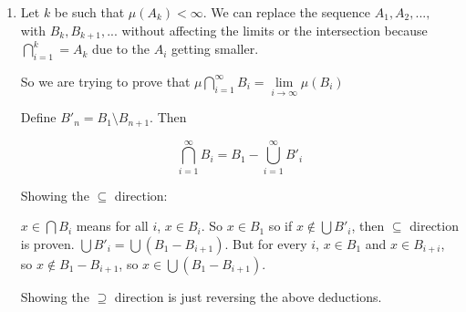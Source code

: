 \documentclass[11pt,oneside]{article}
\numberwithin{equation}{section}
\theoremstyle{definition}
\begin{document}
\begin{solution}
\begin{enumerate}
    Unlike the $A_i$, the $B_i$ are non-overlapping.
    
    Let $x \in B_n$ for some (first) $n$.  Then $x \in A_n$. Then for
    all $m > n$, $x \notin B_m$, as $B_{m} = A_{m} \setminus A_{m-1}$, and
    $x \in A_{m-1}$, when $m > n$. 

    So, by (ii) of the definition of a measure space,
    $$
    \mu ( \bigcup \limits _ {i=1} ^ \infty B_i ) = \sum \limits _ {i=1} ^ \infty \mu (B_i)
    $$
    Since the union of the $A_i$ and the $B_i$ are equal, 
    $$
    \mu ( \bigcup \limits _ {i=1} ^ \infty B_i ) =    \mu ( \bigcup \limits _ {i=1} ^ \infty A_i)
    $$
    Now we have to show that
    $$
    \lim _ {n \to \infty} \mu ( A_n ) = \sum \limits _ {i=1} ^ \infty \mu (B_i)
    $$
    However,
    $$
    \mu (A_n) =  \mu \bigcup \limits _ {i=1} ^ n (B_i)
    $$
    So, 
    $$
    \mu(A_n) = \sum \limits _ {i=i} ^ n \mu (B_i).
    $$
    Taking limits (the sequences are identical at every term and we are in the extended reals so convergance is not an issue):

    $$
    \lim _ {n \to \infty} \mu ( A_n ) = \sum \limits _ {i=1} ^ \infty \mu (B_i)
    $$
    As needed to prove the result \qed
  \item
    Let $k$ be such that $\mu (A_k) < \infty$.  We can replace the
    sequence $ A_1, A_2, ..., $ with $ B_k, B_{k+1}, ...$ without
    affecting the limits or the intersection because
    $ \bigcap \limits _{i=1}^{k} = A_k$ due to the $A_i$ getting smaller.

    So we are trying to prove that $\mu \bigcap \limits _{i=1}^\infty B_i = \lim \limits_{i \to \infty} \mu ( B_i ) $

    Define $B'_n = B_1 \setminus B_{n+1}$.  Then

    $$
    \bigcap \limits _{i=1} ^ \infty B_i = B_1 - \bigcup \limits _{i=1} ^ \infty B'_i
    $$

    Showing the $ \subseteq $ direction: 

    $ x \in \bigcap B_i$ means for all $i$, $ x \in B_i$.  So $x \in B_1$ so if
    $ x \notin \bigcup B'_i$, then $\subseteq $ direction is
    proven.  $\bigcup B'_i = \bigcup (B_1 - B_{i+1})$.  But for every $i$, $x \in
    B_1$ and $x \in B_{i+i}$, so $x \notin B_1 - B_{i+1}$, so $x \in \bigcup (B_1 - B_{i+1})$.

    Showing the $ \supseteq$ direction is just reversing the above deductions.


\end{enumerate}
\end{solution}
\end{document}

